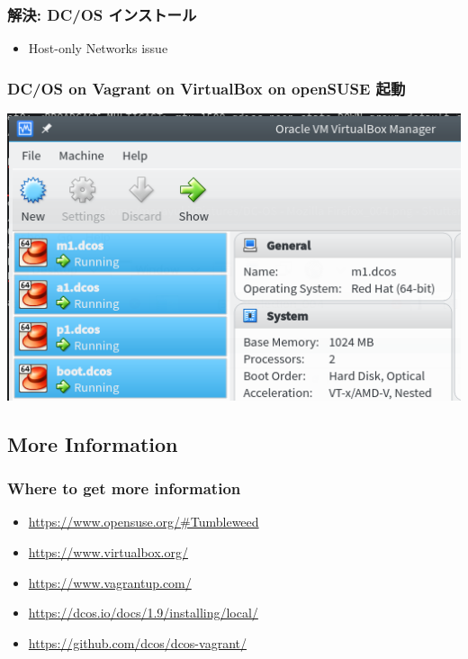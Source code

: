 \documentclass[aspectratio=169,11pt,hyperref={colorlinks=true}]{beamer}
\begin{document}
\begin{frame}
  \frametitle{解決: DC/OS インストール}
  \begin{itemize}
    \item Host-only Networks issue
      
  \end{itemize}
\end{frame}

\begin{frame}
  \frametitle{DC/OS on Vagrant on VirtualBox on openSUSE 起動\!}
    \begin{center}
      \includegraphics[width=.7\textwidth]{dcos_vms.png}
    \end{center}
\end{frame}

\subsection{More Information}
\begin{frame}
\frametitle{Where to get more information}
  \begin{itemize}
    \item \url{https://www.opensuse.org/\#Tumbleweed}
    \item \url{https://www.virtualbox.org/}
    \item \url{https://www.vagrantup.com/}
    \item \url{https://dcos.io/docs/1.9/installing/local/}
    \item \url{https://github.com/dcos/dcos-vagrant/}
  \end{itemize}
\end{frame}

\end{document}
